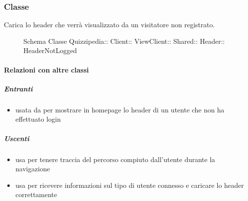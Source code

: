 \subsubsection{Classe }
Carica lo header che verrà visualizzato da un visitatore non registrato.
\begin{figure}[H]
\centering
\noindent{}
\caption[Schema Classe HeaderNotLogged]{Schema Classe Quizzipedia:: Client:: ViewClient:: Shared:: Header:: HeaderNotLogged}
\end{figure}
\paragraph{Relazioni con altre classi}
\subparagraph{Entranti}
\begin{itemize}
\item usata da  per mostrare in homepage lo header di un utente che non ha effettuato login
\end{itemize}
\subparagraph{Uscenti}
\begin{itemize}
\item usa  per tenere traccia del percorso compiuto dall'utente durante la navigazione
\item usa  per ricevere informazioni sul tipo di utente connesso e caricare lo header correttamente
\end{itemize}
